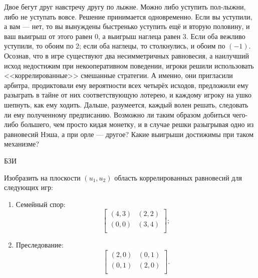 \begin{problem}[Лыжники-2]
\begin{source}
\cite{savva:nmu}
\end{source} Двое бегут друг навстречу другу по лыжне. Можно либо уступить пол-лыжни, либо не уступать вовсе. Решение принимается одновременно. Если вы уступили, а вам --- нет, то вы вынуждены
быстренько уступить ещё и вторую половину, и ваш выигрыш от этого равен 0, а выигрыш наглеца равен 3. Если оба вежливо уступили, то обоим по 2; если оба наглецы, то столкнулись, и обоим по $(-1)$.
Осознав, что в игре существуют два несимметричных равновесия, а наилучший исход недостижим при некооперативном поведении, игроки решили использовать <<коррелированные>> смешанные стратегии. А именно, они пригласили арбитра, продиктовали ему вероятности всех четырёх исходов, предложили ему разыграть в тайне от них соответствующую лотерею, и каждому игроку на ушко шепнуть, как ему ходить. Дальше, разумеется, каждый волен решать, следовать ли ему полученному предписанию.
Возможно ли таким образом добиться чего-либо большего, чем просто кидая монетку, и в случае решки разыгрывая одно из равновесий Нэша, а при орле --- другое? Какие выигрыши достижимы при таком механизме?
\begin{sol}

\end{sol}
\end{problem}

\begin{problem}
\begin{source}
БЗИ
\end{source}
Изобразить на плоскости $(u_1,u_2)$ область коррелированных
равновесий для следующих игр:

\begin{enumerate}

\item Семейный спор:
\[\left[\begin{array}{ll}
(4,3)&(2,2)\\ (0,0)&(3,4)\\
\end{array}\right];\]

\item Преследование:
\[\left[\begin{array}{ll}
(2,0)&(0,1)\\ (0,1)&(2,0)\\
\end{array}\right].\]

\end{enumerate}




\begin{sol}

\end{sol}
\end{problem}







